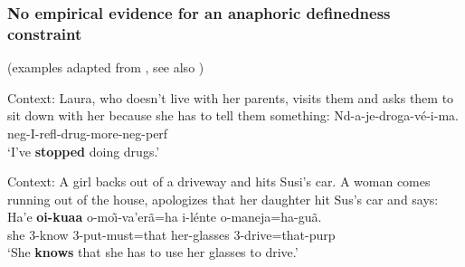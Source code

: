 \documentclass[pdf,xcolor=table,envcountsect,handout]{beamer}
\begin{document}
\begin{frame}
\frametitle{No empirical evidence for an anaphoric definedness constraint}

\vspace*{-.3cm}

\hfill \begin{tiny} (examples adapted from \citealt[80]{brst-lang11}, see also \citealt{spenader02,spenader03}) \end{tiny}

\vspace*{-.2cm}
\pause

\begin{exe}

 Context: Laura, who doesn't live with her parents, visits them and asks them to sit down with her because she has to tell them something: 
\gll Nd-a-je-droga-v\'e-i-ma. \\ {\sc neg-}I-{\sc refl}-drug-more{\sc -neg-perf} \\ \glt `I've {\bf stopped} doing drugs.' 

\pause

 Context: A girl backs out of a driveway and hits Susi's car. A woman comes running out of the house, apologizes that her daughter hit Sus's car and says: \gll Ha'e {\bf oi-kuaa} o-mo\~{\i}-va'er\~a=ha i-l\'ente o-maneja=ha-gu\~a. \\ she 3-know 3-put-must=that her-glasses 3-drive=that{\sc -purp} \\ \glt `She {\bf knows} that she has to use her glasses to drive.' 


\end{exe}
\end{frame}
\end{document}
